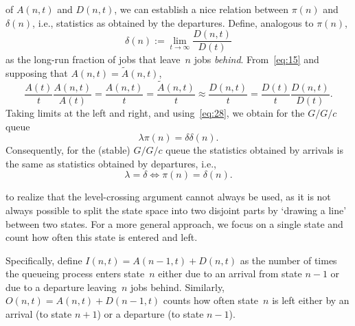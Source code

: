 \documentclass[stochastic-or.tex]{subfiles}
\begin{document}
 of $A(n,t)$ and $D(n,t)$, we can  establish a nice relation between $\pi(n)$ and $\delta(n)$, i.e.,  statistics as obtained by the departures. Define, analogous to $\pi(n)$,
\begin{equation*}
 \delta(n) := \lim_{t\to\infty} \frac{D(n,t)}{D(t)}
\end{equation*}
as the long-run fraction of jobs that leave~$n$ jobs \emph{behind}.
From~\cref{eq:15} and supposing that $A(n,t) = \tilde A(n,t)$,
\begin{equation*}
\frac{A(t)}t \frac{A(n,t)}{A(t)} = \frac{A(n,t)}t = \frac{\tilde A(n,t)}{t}\approx \frac{D(n,t)}t
= \frac{D(t)}t \frac{D(n,t)}{D(t)}.
\end{equation*}
Taking limits at the left and right, and using~\cref{eq:28}, we obtain for the $G/G/c$ queue
\begin{equation} \label{eq:36}
 \lambda \pi(n) = \delta \delta(n).
\end{equation}
Consequently, for the (stable)  $G/G/c$ queue  the statistics obtained by arrivals is the same as statistics obtained by departures, i.e.,
\begin{equation} \label{eq:39}
\lambda = \delta \iff \pi(n) = \delta(n).
\end{equation}


 to realize that the level-crossing argument cannot always be used, as it is not always possible to split the state space into two disjoint parts by `drawing a line' between two states.
For a more general approach, we focus on a single state and count how often this state is entered and left.
\begin{marginfigure}
\end{marginfigure}
Specifically, define $I(n,t) = A(n-1,t) + D(n,t)$ as the number of times the queueing process enters state~$n$ either due to an arrival from state $n-1$ or due to a departure leaving~$n$ jobs behind. Similarly,  $O(n,t) = A(n,t) + D(n-1,t)$ counts how often state~$n$ is left either by an arrival (to state $n+1$) or a departure (to state $n-1$).
\end{document}
